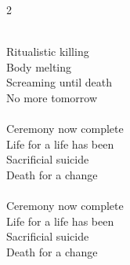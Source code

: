 \begin{multicols}{2}
{\mbox{} \\
Ritualistic killing \\
Body melting \\
Screaming until death \\
No more tomorrow \\
\mbox{} \\
Ceremony now complete \\
Life for a life has been \\
Sacrificial suicide \\
Death for a change \\
\mbox{} \\
Ceremony now complete \\
Life for a life has been \\
Sacrificial suicide \\
Death for a change\par}
\medskip


\end{multicols}
